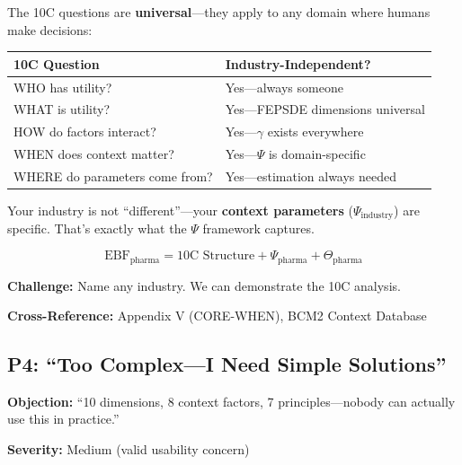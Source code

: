 \begin{axiom}
The 10C questions are \textbf{universal}---they apply to any domain where
humans make decisions:

\begin{center}
\begin{tabular}{ll}
\textbf{10C Question} & \textbf{Industry-Independent?} \\
\midrule
WHO has utility? & Yes---always someone \\
WHAT is utility? & Yes---FEPSDE dimensions universal \\
HOW do factors interact? & Yes---$\gamma$ exists everywhere \\
WHEN does context matter? & Yes---$\Psi$ is domain-specific \\
WHERE do parameters come from? & Yes---estimation always needed \\
\end{tabular}
\end{center}

Your industry is not ``different''---your \textbf{context parameters} ($\Psi_{\text{industry}}$)
are specific. That's exactly what the $\Psi$ framework captures.

\begin{equation}
\text{EBF}_{\text{pharma}} = \text{10C Structure} + \Psi_{\text{pharma}} + \Theta_{\text{pharma}}
\end{equation}
\end{axiom}

\textbf{Challenge:} Name any industry. We can demonstrate the 10C analysis.

\textbf{Cross-Reference:} Appendix V (CORE-WHEN), BCM2 Context Database

\subsection{P4: ``Too Complex---I Need Simple Solutions''}
\label{sec:da-p4}

\begin{tcolorbox}[colback=gray!5!white, colframe=gray!75!black]
\textbf{Objection:} ``10 dimensions, 8 context factors, 7 principles---nobody
can actually use this in practice.''

\textbf{Severity:} Medium (valid usability concern)
\end{tcolorbox}

